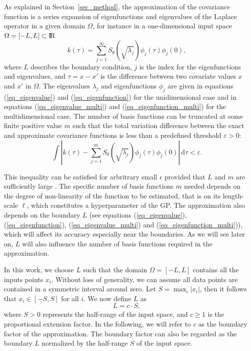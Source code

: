 As explained in Section~\ref{sec_method}, the approximation of the covariance function is a series expansion of eigenfunctions and eigenvalues of the Laplace operator in a given domain $\Omega$, for instance in a one-dimensional input space $\Omega=[-L,L]\subset {\rm I\!R}$
%
\begin{equation*}
k(\tau) = \sum_{j=1}^{\infty} S_{\theta}(\sqrt{\lambda_j}) \phi_j(\tau) \phi_j(0), 
\end{equation*}
%
where $L$ describes the boundary condition, $j$ is the index for the eigenfunctions and eigenvalues, and $\tau=x-x'$ is the difference between two covariate values $x$ and $x'$ in $\Omega$. The eigenvalues $\lambda_j$ and eigenfunctions $\phi_j$ are given in equations (\ref{eq_eigenvalue}) and (\ref{eq_eigenfunction}) for the unidimensional case and in equations (\ref{eq_eigenvalue_multi}) and (\ref{eq_eigenfunction_multi}) for the multidimensional case. The number of basis functions can be truncated at some finite positive value $m$ such that the total variation difference between the exact and approximate covariance functions is less than a predefined threshold $\varepsilon > 0$:
%
\begin{equation}\label{eq_diff_covs}
 \int | k(\tau) - \sum_{j=1}^m S_{\theta}(\sqrt{\lambda_j}) \phi_j(\tau) \phi_j(0)|  \,\mathrm{d}\tau  < \varepsilon.
\end{equation}

This inequality can be satisfied for arbritrary small $\epsilon$ provided that $L$ and $m$ are sufficiently large \cite[Theorem 1 and 4]{solin2018hilbert}. 
The specific number of basis functions $m$ needed depends on the degree of non-linearity of the function to be estimated, that is on its length-scale $\ell$, which constitutes a hyperparameter of the GP. The approximation also depends on the boundary $L$ (see equations (\ref{eq_eigenvalue}), (\ref{eq_eigenfunction}), (\ref{eq_eigenvalue_multi}) and (\ref{eq_eigenfunction_multi})), which will affect its accuracy especially near the boundaries. As we will see later on, $L$ will also influence the number of basis functions required in the approximation.

In this work, we choose $L$ such that the domain $\Omega = \left[-L, L\right]$ contains all the inputs points $x_i$. Without loss of generality, we can assume all data points are contained in a symmetric interval around zero. Let $S = \max_{i}|x_i|$, then it follows that $x_i \in \left[-S, S\right]$ for all $i$. We now define $L$ as
\begin{equation}\label{eq_boundary}
L=c \cdot S,
\end{equation} 
%
where $S > 0$ represents the half-range of the input space, and $c \geq 1$ is the proportional extension factor. In the following, we will refer to $c$ as the boundary factor of the approximation. The boundary factor can also be regarded as the boundary $L$ normalized by the half-range $S$ of the input space.

